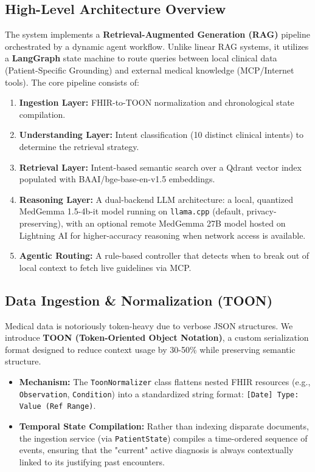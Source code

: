 \subsection{High-Level Architecture Overview}
The system implements a \textbf{Retrieval-Augmented Generation (RAG)} pipeline orchestrated by a dynamic agent workflow. Unlike linear RAG systems, it utilizes a \textbf{LangGraph} state machine to route queries between local clinical data (Patient-Specific Grounding) and external medical knowledge (MCP/Internet tools). The core pipeline consists of:
\begin{enumerate}
    \item \textbf{Ingestion Layer:} FHIR-to-TOON normalization and chronological state compilation.
    \item \textbf{Understanding Layer:} Intent classification (10 distinct clinical intents) to determine the retrieval strategy.
    \item \textbf{Retrieval Layer:} Intent-based semantic search over a Qdrant vector index populated with BAAI/bge-base-en-v1.5 embeddings.
    \item \textbf{Reasoning Layer:} A dual-backend LLM architecture: a local, quantized MedGemma 1.5-4b-it model running on \texttt{llama.cpp} (default, privacy-preserving), with an optional remote MedGemma 27B model hosted on Lightning AI for higher-accuracy reasoning when network access is available.
    \item \textbf{Agentic Routing:} A rule-based controller that detects when to break out of local context to fetch live guidelines via MCP.
\end{enumerate}

\subsection{Data Ingestion \& Normalization (TOON)}
Medical data is notoriously token-heavy due to verbose JSON structures. We introduce \textbf{TOON (Token-Oriented Object Notation)}, a custom serialization format designed to reduce context usage by 30-50\% while preserving semantic structure.

\begin{itemize}
    \item \textbf{Mechanism:} The \texttt{ToonNormalizer} class flattens nested FHIR resources (e.g., \texttt{Observation}, \texttt{Condition}) into a standardized string format: \texttt{[Date] Type: Value (Ref Range)}.
    \item \textbf{Temporal State Compilation:} Rather than indexing disparate documents, the ingestion service (via \texttt{PatientState}) compiles a time-ordered sequence of events, ensuring that the "current" active diagnosis is always contextually linked to its justifying past encounters.
\end{itemize}

